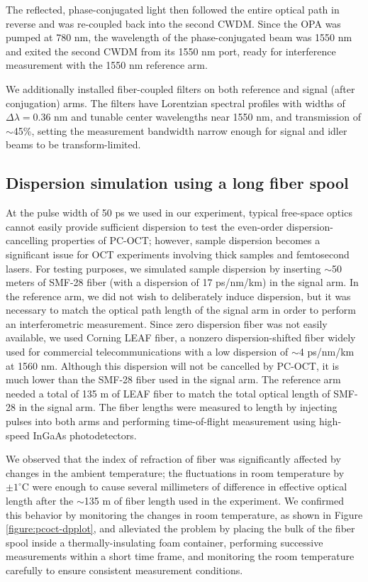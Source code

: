 The reflected, phase-conjugated light then followed the entire optical path in reverse and was re-coupled back into the second CWDM. Since the OPA was pumped at 780 nm, the wavelength of the phase-conjugated beam was 1550 nm and exited the second CWDM from its 1550 nm port, ready for interference measurement with the 1550 nm reference arm.

We additionally installed fiber-coupled filters on both reference and signal (after conjugation) arms. The filters have Lorentzian spectral profiles with widths of $\Delta\lambda = 0.36$ nm and tunable center wavelengths near 1550 nm, and transmission of $\sim$45\%, setting the measurement bandwidth narrow enough for signal and idler beams to be transform-limited.

\subsection{Dispersion simulation using a long fiber spool}

At the pulse width of 50 ps we used in our experiment, typical free-space optics cannot easily provide sufficient dispersion to test the even-order dispersion-cancelling properties of PC-OCT; however, sample dispersion becomes a significant issue for OCT experiments involving thick samples and femtosecond lasers. For testing purposes, we simulated sample dispersion by inserting $\sim$50 meters of SMF-28 fiber (with a dispersion of 17 ps/nm/km) in the signal arm. In the reference arm, we did not wish to deliberately induce dispersion, but it was necessary to match the optical path length of the signal arm in order to perform an interferometric measurement. Since zero dispersion fiber was not easily available, we used Corning LEAF fiber, a nonzero dispersion-shifted fiber widely used for commercial telecommunications with a low dispersion of $\sim$4 ps/nm/km at 1560 nm. Although this dispersion will not be cancelled by PC-OCT, it is much lower than the SMF-28 fiber used in the signal arm. The reference arm needed a total of 135 m of LEAF fiber to match the total optical length of SMF-28 in the signal arm. The fiber lengths were measured to length by injecting pulses into both arms and performing time-of-flight measurement using high-speed InGaAs photodetectors.

We observed that the index of refraction of fiber was significantly affected by changes in the ambient temperature; the fluctuations in room temperature by $\pm 1^\circ$C were enough to cause several millimeters of difference in effective optical length after the $\sim$135 m of fiber length used in the experiment. We confirmed this behavior by monitoring the changes in room temperature, as shown in Figure \ref{figure:pcoct-dpplot}, and alleviated the problem by placing the bulk of the fiber spool inside a thermally-insulating foam container, performing successive measurements within a short time frame, and monitoring the room temperature carefully to ensure consistent measurement conditions.

